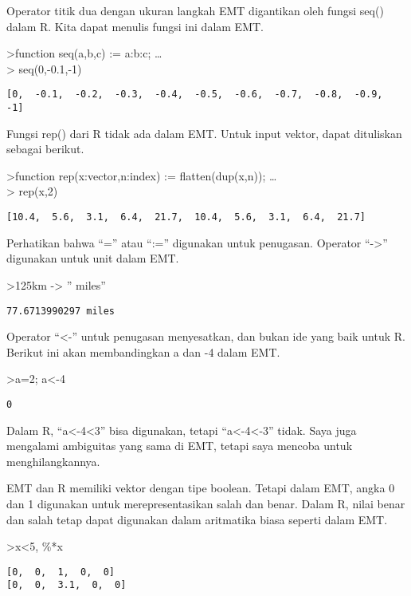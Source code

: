 \documentclass[
]{book}
\begin{document}
Operator titik dua dengan ukuran langkah EMT digantikan oleh fungsi seq() dalam R. Kita dapat menulis fungsi ini dalam EMT.

\textgreater function seq(a,b,c) := a:b:c; \ldots{}\\
\textgreater{} seq(0,-0.1,-1)

\begin{verbatim}
[0,  -0.1,  -0.2,  -0.3,  -0.4,  -0.5,  -0.6,  -0.7,  -0.8,  -0.9,  -1]
\end{verbatim}

Fungsi rep() dari R tidak ada dalam EMT. Untuk input vektor, dapat dituliskan sebagai berikut.

\textgreater function rep(x:vector,n:index) := flatten(dup(x,n)); \ldots{}\\
\textgreater{} rep(x,2)

\begin{verbatim}
[10.4,  5.6,  3.1,  6.4,  21.7,  10.4,  5.6,  3.1,  6.4,  21.7]
\end{verbatim}

Perhatikan bahwa ``='' atau ``:='' digunakan untuk penugasan. Operator ``-\textgreater{}'' digunakan untuk unit dalam EMT.

\textgreater125km -\textgreater{} '' miles''

\begin{verbatim}
77.6713990297 miles
\end{verbatim}

Operator ``\textless-'' untuk penugasan menyesatkan, dan bukan ide yang baik untuk R. Berikut ini akan membandingkan a dan -4 dalam EMT.

\textgreater a=2; a\textless-4

\begin{verbatim}
0
\end{verbatim}

Dalam R, ``a\textless-4\textless3'' bisa digunakan, tetapi ``a\textless-4\textless-3'' tidak. Saya juga mengalami ambiguitas yang sama di EMT, tetapi saya mencoba untuk menghilangkannya.

EMT dan R memiliki vektor dengan tipe boolean. Tetapi dalam EMT, angka 0 dan 1 digunakan untuk merepresentasikan salah dan benar. Dalam R, nilai benar dan salah tetap dapat digunakan dalam aritmatika biasa seperti dalam EMT.

\textgreater x\textless5, \%*x

\begin{verbatim}
[0,  0,  1,  0,  0]
[0,  0,  3.1,  0,  0]
\end{verbatim}
\end{document}
